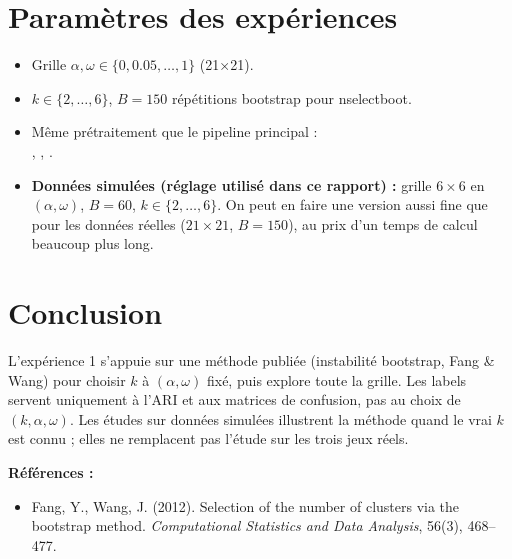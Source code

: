 \documentclass[11pt, a4paper]{article}
\begin{document}
\section{Paramètres des expériences}

\begin{itemize}
  \item Grille $\alpha,\omega \in \{0, 0.05, \ldots, 1\}$ (21×21).
  \item $k \in \{2,\ldots,6\}$, $B=150$ répétitions bootstrap pour nselectboot.
  \item Même prétraitement que le pipeline principal :\\
    , , .
  \item \textbf{Données simulées (réglage utilisé dans ce rapport) :} grille
    $6\times6$ en $(\alpha,\omega)$, $B=60$, $k\in\{2,\ldots,6\}$. On peut en
    faire une version aussi fine que pour les données réelles ($21\times21$,
    $B=150$), au prix d'un temps de calcul beaucoup plus long.
\end{itemize}

\section{Conclusion}

L'expérience 1 s'appuie sur une méthode publiée (instabilité bootstrap, Fang \&
Wang) pour choisir $k$ à $(\alpha,\omega)$ fixé, puis explore toute la grille.
Les labels servent uniquement à l'ARI et aux matrices de confusion, pas au choix
de $(k,\alpha,\omega)$. Les études sur données simulées illustrent la méthode quand
le vrai $k$ est connu ; elles ne remplacent pas l'étude sur les trois jeux réels.

\vspace{1em}
\noindent\textbf{Références :}
\begin{itemize}
  \item Fang, Y., Wang, J. (2012). Selection of the number of clusters via the
    bootstrap method. \textit{Computational Statistics and Data Analysis}, 56(3),
    468--477.
\end{itemize}
\end{document}
